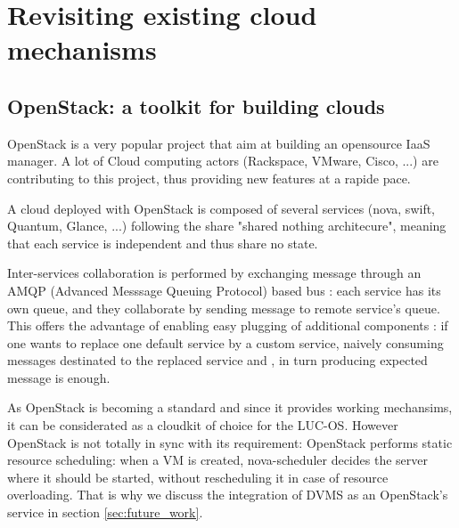 \section{Revisiting existing cloud mechanisms}
\label{sec:integration}

\subsection{OpenStack: a toolkit for building clouds}

	





OpenStack is a very popular project that aim at building an opensource IaaS
manager. A lot of Cloud computing actors (Rackspace, VMware, Cisco, ...) are
contributing to this project, thus providing new features at a rapide pace.

A cloud deployed with OpenStack is composed of several services (nova, swift,
Quantum, Glance, ...) following the share "shared nothing architecure", meaning 
that each service is independent and thus share no state.

Inter-services collaboration is performed by exchanging message through an AMQP 
(Advanced Messsage Queuing Protocol) based bus : each service has its own queue,
and they collaborate by sending message to remote service's queue. This offers
the advantage of enabling easy plugging of additional components : if one wants
to replace one default service by a custom service, naively consuming messages
destinated to the replaced service and , in turn producing expected message is
enough.

As OpenStack is becoming a standard and since it provides working mechansims, it
can be considerated as a cloudkit of choice for the LUC-OS. However OpenStack is
not totally in sync with its requirement: OpenStack performs static resource
scheduling: when a VM is created, nova-scheduler decides the server where it
should be started, without rescheduling it in case of resource overloading. That
is why we discuss the integration of DVMS as an OpenStack's service in section 
\ref{sec:future_work}.

